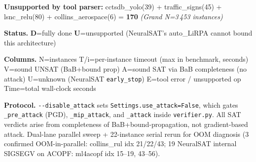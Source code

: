 \documentclass[10pt]{beamer}
\newcommand{\sdone}{{\color{cdone}\textbf{D}}}
\newcommand{\sunsup}{{\color{cunsup}\textbf{U}}}
\begin{document}
\begin{frame}[fragile]
\textbf{Unsupported by tool parser:} cctsdb\_yolo(39) + traffic\_signs(45) + lsnc\_relu(80) + collins\_aerospace(6) = \textbf{170} \quad \emph{(Grand N=3\,453 instances)}

\vspace{0.3em}
\centering\scriptsize
\textbf{Status.}\;
\sdone{}=fully done\quad
\sunsup{}=unsupported (NeuralSAT's auto\_LiRPA cannot bound this architecture)

\vspace{0.2em}
\centering\scriptsize
\textbf{Columns.}\;
N=instances\quad
T/i=per-instance timeout (max in benchmark, seconds)\quad
V=sound UNSAT (BaB+bound prop)\quad
A=sound SAT via BaB completeness (no attack)\quad
U=unknown (NeuralSAT \texttt{early\_stop})\quad
E=tool error / unsupported op\quad
Time=total wall-clock seconds

\vspace{0.2em}
\centering\scriptsize
\textbf{Protocol.}\;
\texttt{-{}-disable\_attack} sets \texttt{Settings.use\_attack=False}, which gates
\texttt{\_pre\_attack} (PGD), \texttt{\_mip\_attack}, and \texttt{\_attack} inside
\texttt{verifier.py}. All SAT verdicts arise from completeness of BaB+bound-propagation,
not gradient-based attack. Dual-lane parallel sweep + 22-instance serial rerun for OOM
diagnosis (3 confirmed OOM-in-parallel: collins\_rul idx 21/22/43; 19 NeuralSAT internal
SIGSEGV on ACOPF: ml4acopf idx 15--19, 43--56).

\end{frame}
\end{document}
